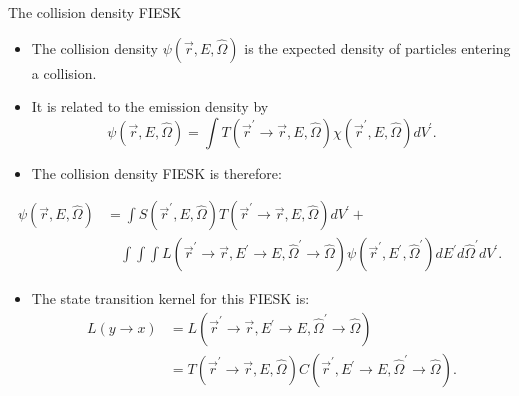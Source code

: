 \documentclass{beamer}
\begin{document}
\begin{frame}{The collision density FIESK}    

  \begin{itemize}
    \item The collision density $\psi(\vec{r},E,\hat{\Omega})$ is the expected 
      density of particles entering a collision.
    \item It is related to the emission density by
      \begin{equation*}
        \psi(\vec{r},E,\hat{\Omega}) = \int 
        T(\vec{r}^{'} \to \vec{r},E,\hat{\Omega})
        \chi(\vec{r}^{'},E,\hat{\Omega})dV^{'}.
      \end{equation*}
    \item The collision density FIESK is therefore:
  \end{itemize}
  \begin{align}
    \psi(\vec{r},E,\hat{\Omega}) & = \int S(\vec{r}^{'},E,\hat{\Omega})
    T(\vec{r}^{'} \to \vec{r},E,\hat{\Omega}) dV^{'} + \nonumber \\ 
    & \quad \int\int\int
    L(\vec{r}^{'} \to \vec{r},E^{'} \to E,\hat{\Omega}^{'} \to \hat{\Omega}) 
    \psi(\vec{r}^{'},E^{'},\hat{\Omega}^{'}) dE^{'}d\hat{\Omega}^{'}dV^{'}.
    \nonumber
  \end{align}
  \begin{itemize}
    \item The state transition kernel for this FIESK is:
      \begin{align}
        L(y \to x) & = 
        L(\vec{r}^{'} \to \vec{r},E^{'} \to E,\hat{\Omega}^{'} \to \hat{\Omega}) 
        \nonumber \\
        & = T(\vec{r}^{'} \to \vec{r},E,\hat{\Omega})
        C(\vec{r}^{'},E^{'} \to E,\hat{\Omega}^{'} \to \hat{\Omega}). \nonumber
      \end{align}
  \end{itemize}
  
\end{frame}
\end{document}
